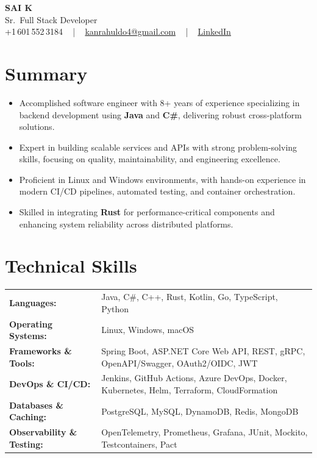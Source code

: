 \documentclass[letterpaper,11pt]{article}
\newcommand{\resumeItem}[1]{
  \item\footnotesize{
    {#1 \vspace{-2pt}}
  }
}
\newcommand{\resumeItemListStart}{\begin{itemize}[leftmargin=*]}
\newcommand{\resumeItemListEnd}{\end{itemize}\vspace{-5pt}}
\begin{document}
\begin{center}
    {\fontsize{14pt}{12pt}\selectfont \textbf{\MakeUppercase{Sai K}}}\\ \vspace{2pt}
    \fontsize{10pt}{12pt}\selectfont Sr.\ Full Stack Developer\\ \vspace{2pt}
    \fontsize{10pt}{12pt}\selectfont +1\,601\,552\,3184 ~ | ~
    \href{mailto:kanrahuldo4@gmail.com}{kanrahuldo4@gmail.com} ~ | ~
    \href{https://www.linkedin.com/in/srrrk/}{\color{blue}\underline{LinkedIn}}
    \vspace{-10pt}
\end{center}

\section{Summary}
\fontsize{9pt}{10pt}\selectfont
\resumeItemListStart
  \resumeItem{Accomplished software engineer with 8+ years of experience specializing in backend development using \textbf{Java} and \textbf{C\#}, delivering robust cross-platform solutions.}
  \resumeItem{Expert in building scalable services and APIs with strong problem-solving skills, focusing on quality, maintainability, and engineering excellence.}
  \resumeItem{Proficient in Linux and Windows environments, with hands-on experience in modern CI/CD pipelines, automated testing, and container orchestration.}
  \resumeItem{Skilled in integrating \textbf{Rust} for performance-critical components and enhancing system reliability across distributed platforms.}
\resumeItemListEnd
\vspace{-6pt}

\section{Technical Skills}
\vspace{-14pt}
\begin{table}[h]
\fontsize{9pt}{10pt}\selectfont
\begin{tabular}{p{0.3\linewidth} p{0.7\linewidth}}
\textbf{Languages:} & Java, C\#, C++, Rust, Kotlin, Go, TypeScript, Python \\
\textbf{Operating Systems:} & Linux, Windows, macOS \\
\textbf{Frameworks \& Tools:} & Spring Boot, ASP.NET Core Web API, REST, gRPC, OpenAPI/Swagger, OAuth2/OIDC, JWT \\
\textbf{DevOps \& CI/CD:} & Jenkins, GitHub Actions, Azure DevOps, Docker, Kubernetes, Helm, Terraform, CloudFormation \\
\textbf{Databases \& Caching:} & PostgreSQL, MySQL, DynamoDB, Redis, MongoDB \\
\textbf{Observability \& Testing:} & OpenTelemetry, Prometheus, Grafana, JUnit, Mockito, Testcontainers, Pact \\
\end{tabular}
\end{table}
\vspace{-15pt}
\end{document}

